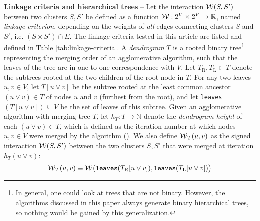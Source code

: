 \textbf{Linkage criteria and hierarchical trees} -- 
Let the interaction $\mathcal{W}(S,S')$ between two clusters $S,S'$ be defined as a function $\mathcal{W}{}:2^{V} \times 2^{V} \rightarrow \mathbb{R}$, named \emph{linkage criterion}, depending on the weights of \emph{all} edges connecting clusters $S$ and $S'$, i.e. ${(S \times S') \cap E}$. 
The linkage criteria tested in this article are listed and defined in Table \ref{tab:linkage-criteria}.
A \emph{dendrogram} $T$ is a rooted binary tree\footnote{In general, one could look at trees that are not binary. However, the algorithms discussed in this paper always generate binary hierarchical trees, so nothing would be gained by this generalization.} representing the merging order of an agglomerative algorithm, such that the leaves of the tree are in one-to-one correspondence with $V$. 
Let $T_{\mathrm{R}},T_{\mathrm{L}}\subset T$ denote the subtrees rooted at the two children of the root node in $T$.
For any two leaves $u,v \in V$, let $T[u \vee v]$ be the subtree rooted at the least common ancestor $(u \vee v)\in T$ of nodes $u$ and $v$ (furthest from the root), and let \texttt{leaves}$(T[u \vee v])\subseteq V$ be the set of leaves of this subtree. 
Given an agglomerative algorithm with merging tree $T$, let $h_T:T \rightarrow \mathbb{N}$ denote the \emph{dendrogram-height} of each $(u\vee v)\in T$, which is defined as the iteration number at which nodes $u,v\in V$ were merged by the algorithm (). We also define $\mathcal{W}{}_{T}(u,v)$ as the signed interaction $\mathcal{W}{}(S,S')$ between the two clusters $S,S'$ that were merged at iteration $h_T(u\vee v)$: 
\begin{equation}\label{eq:def_dendr_interact}
\mathcal{W}{}_{T}(u,v) \equiv \mathcal{W}{} \big( \text{\texttt{leaves}}(T_{\mathrm{R}}[u \vee v]), \text{\texttt{leaves}}(T_{\mathrm{L}}[u \vee v]) \big)
\end{equation}




